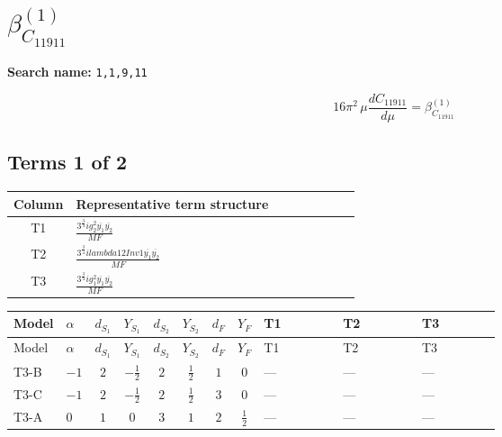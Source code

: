 \documentclass[8pt]{article}
\begin{document}
\begin{landscape}
\begin{longtable}{@{}llcccccc >{\raggedright\arraybackslash}p{0.21\linewidth} >{\raggedright\arraybackslash}p{0.21\linewidth} >{\raggedright\arraybackslash}p{0.21\linewidth}@{}}
\midrule
\bottomrule
\end{longtable}
\clearpage
\section*{$\beta_{C_{11911}}^{(1)}$}
\noindent\textbf{Search name: }\texttt{1,1,9,11}\par\smallskip
\[16\pi^2\,\mu\frac{d C_{11911}}{d\mu}=\beta_{C_{11911}}^{(1)}\]
\subsection*{Terms 1 of 2}
\begin{center}
\begin{tabular}{@{}c >{\raggedright\arraybackslash}p{0.82\linewidth}@{}}
\toprule
Column & Representative term structure \\
\midrule
T1 & \(\displaystyle \frac{3^{\frac{3}{4}} i g_{2}^{2} \overline{y_{1}} \overline{y_{2}}}{MF}\) \\
\midrule
T2 & \(\displaystyle \frac{3^{\frac{3}{4}} i lambda12Inv1 \overline{y_{1}} \overline{y_{2}}}{MF}\) \\
\midrule
T3 & \(\displaystyle \frac{3^{\frac{3}{4}} i g_{1}^{2} \overline{y_{1}} \overline{y_{2}}}{MF}\) \\
\midrule
\bottomrule
\end{tabular}
\end{center}
\smallskip
\tiny
\begin{longtable}{@{}llcccccc >{\raggedright\arraybackslash}p{0.21\linewidth} >{\raggedright\arraybackslash}p{0.21\linewidth} >{\raggedright\arraybackslash}p{0.21\linewidth}@{}}
\toprule
Model & $\alpha$ & $d_{S_1}$ & $Y_{S_1}$ & $d_{S_2}$ & $Y_{S_2}$ & $d_F$ & $Y_F$ & T1 & T2 & T3 \\
\midrule
\endfirsthead
\toprule
Model & $\alpha$ & $d_{S_1}$ & $Y_{S_1}$ & $d_{S_2}$ & $Y_{S_2}$ & $d_F$ & $Y_F$ & T1 & T2 & T3 \\
\midrule
\endhead
T3-B & $-1$ & $2$ & $-\frac{1}{2}$ & $2$ & $\frac{1}{2}$ & $1$ & $0$ & --- & --- & --- \\
\midrule
T3-C & $-1$ & $2$ & $-\frac{1}{2}$ & $2$ & $\frac{1}{2}$ & $3$ & $0$ & --- & --- & --- \\
\midrule
T3-A & $0$ & $1$ & $0$ & $3$ & $1$ & $2$ & $\frac{1}{2}$ & --- & --- & --- \\
\midrule

\end{longtable}
\end{landscape}
\end{document}
